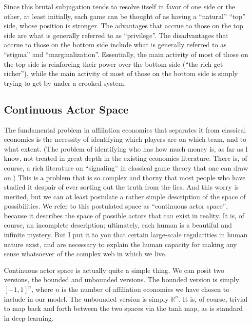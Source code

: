 \documentclass{article}
\begin{document}
Since this brutal subjugation tends to resolve itself in favor of one
side or the other, at least initially, each game can be thought of as
having a ``natural'' ``top'' side, whose position is stronger. The
advantages that accrue to those on the top side are what is generally
referred to as ``privilege''. The disadvantages that accrue to those
on the bottom side include what is generally referred to as ``stigma''
and ``marginalization''. Essentially, the main activity of most of
those on the top side is reinforcing their power over the bottom side
(``the rich get richer''), while the main activity of most of those on
the bottom side is simply trying to get by under a crooked system.

\subsection{Continuous Actor Space}

The fundamental problem in affiliation economics that separates it
from classical economics is the necessity of identifying which players
are on which team, and to what extent. (The problem of identifying who
has how much money is, as far as I know, not treated in great depth in
the existing economics literature. There is, of course, a rich
literature on ``signaling'' in classical game theory that one can draw
on.) This is a problem that is so complex and thorny that most people
who have studied it despair of ever sorting out the truth from the
lies. And this worry is merited, but we can at least postulate a
rather simple description of the space of possibilities. We refer to
this postulated space as ``continuous actor space'', because it
describes the space of possible actors that can exist in reality. It
is, of course, an incomplete description; ultimately, each human is a
beautiful and infinite mystery. But I put it to you that certain
large-scale regularities in human nature exist, and are necessary to
explain the human capacity for making any sense whatsoever of the
complex web in which we live.

Continuous actor space is actually quite a simple thing. We can posit
two versions, the bounded and unbounded versions. The bounded version
is simply $[-1, 1]^n$, where $n$ is the number of affiliation
economies we have chosen to include in our model. The unbounded
version is simply $\mathbb{R}^n$. It is, of course, trivial to map
back and forth between the two spaces via the $\mathrm{tanh}$ map, as
is standard in deep learning.
\end{document}
